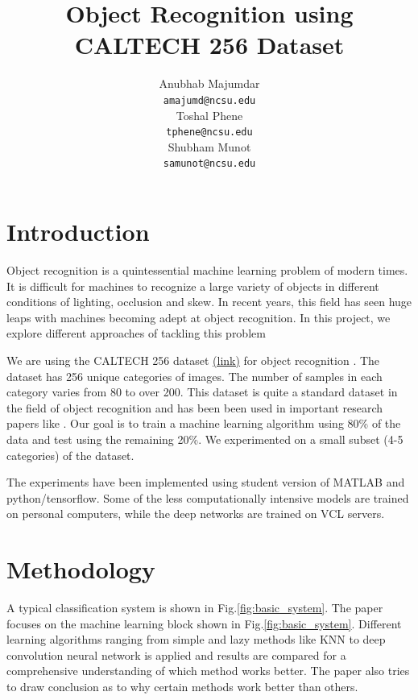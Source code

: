 \documentclass{article} %
\title{Object Recognition using CALTECH 256 Dataset}
\author{
Anubhab Majumdar \\
\texttt{amajumd@ncsu.edu} \\
\And
Toshal Phene \\
\texttt{tphene@ncsu.edu} \\
\AND
Shubham Munot \\
\texttt{samunot@ncsu.edu} \\
}
\begin{document}
\maketitle


\section{Introduction}
Object recognition is a quintessential machine learning problem of modern times. It is difficult for machines to recognize a large variety of objects in different conditions of lighting, occlusion and skew. In recent years, this field has seen huge leaps with machines becoming adept at object recognition. In this project, we explore different approaches of tackling this problem

\par We are using the CALTECH 256 dataset \href{http://www.vision.caltech.edu/Image_Datasets/Caltech256/}{(link)} for object recognition \cite{caltech_dataset_paper}. The dataset has 256 unique categories of images. The number of samples in each category varies from 80 to over 200. This dataset is quite a standard dataset in the field of object recognition and has been been used in important research papers like \cite{knn_svm_paper}. Our goal is to train a machine learning algorithm using 80\% of the data and test using the remaining 20\%. We experimented on a small subset (4-5 categories) of the dataset. 

\par The experiments have been implemented using student version of MATLAB and python/tensorflow. Some of the less computationally intensive models are trained on personal computers, while the deep networks are trained on VCL servers.


\section{Methodology}

A typical classification system is shown in Fig.\ref{fig:basic_system}. The paper focuses on the machine learning block shown in Fig.\ref{fig:basic_system}. Different learning algorithms ranging from simple and lazy methods like KNN to deep convolution neural network is applied and results are compared for a comprehensive understanding of which method works better. The paper also tries to draw conclusion as to why certain methods work better than others. 
\end{document}
